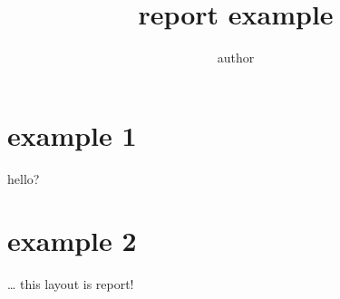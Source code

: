 \documentclass[a4paper,11pt]{report}
\author{author}
\title{report example}
\begin{document}
 
\maketitle  
\tableofcontents 
\section{example 1} hello?
\section{example 2} 
\ldots{} this layout is report!
\end{document}
